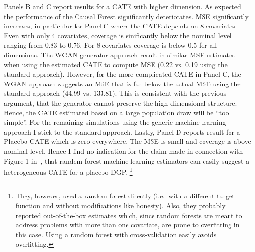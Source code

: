 \documentclass[11pt, a4paper, leqno]{article}
\begin{document}
Panels B and C report results for a CATE with higher dimension. As expected the performance of the Causal Forest significantly deteriorates.
MSE significantly increases, in particular for Panel C where the CATE depends on 8 covariates.
Even with only 4 covariates, coverage is sinificantly below the nominal level ranging from 0.83 to 0.76. For 8 covariates coverage is below 0.5 for all dimensions.
The WGAN generator approach result in similar MSE estimates when using the estimated CATE to compute MSE (0.22 vs. 0.19 using the standard approach).
However, for the more complicated CATE in Panel C, the WGAN approach suggests an MSE that is far below the actual MSE using the standard approach (44.99 vs. 133.81).
This is consistent with the previous argument, that the generator cannot preserve the high-dimensional structure. Hence, the CATE estimated based on a large population draw will be ``too simple''.
For the remaining simulations using the generic machine learning approach I stick to the standard approach.
Lastly, Panel D reports result for a Placebo CATE which is zero everywhere. The MSE is small and coverage is above nominal level.
Hence I find no indication for the claim made in connection with Figure 1 in~\cite{chernozhukov2023genml}, that random forest machine learning estimators can easily suggest a heterogeneous CATE for a placebo DGP\@.
\footnote{They, however, used a random forest directly (i.e.\ with a different target function and without modifications like honesty). Also, they probably reported out-of-the-box estimates which, since random forests are meant to address problems with more than one covariate, are prone to overfitting in this case. Using a random forest with cross-validation easily avoids overfitting.}
\end{document}
